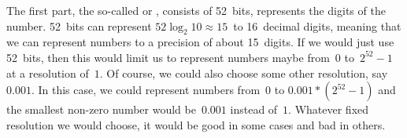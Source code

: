 %
%
%
The first part, the so-called  or , consists of 52~bits, represents the digits of the number.
52~bits can represent $52\log_2 10\approx 15$~to 16~decimal digits, meaning that we can represent numbers to a precision of about 15~digits.
If we would just use 52~bits, then this would limit us to represent numbers maybe from~$0$ to~$2^{52}-1$ at a resolution of~$1$.
Of course, we could also choose some other resolution, say~$0.001$.
In this case, we could represent numbers from~$0$ to $0.001*(2^{52}-1)$ and the smallest non-zero number would be~$0.001$ instead of~$1$.
Whatever fixed resolution we would choose, it would be good in some cases and bad in others.

